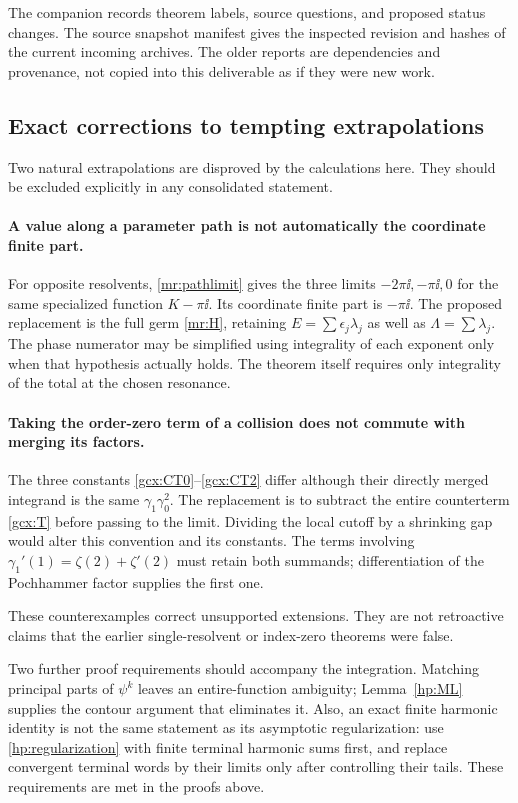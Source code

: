 The companion  records theorem labels,
source questions, and proposed status changes. The source snapshot
manifest gives the inspected revision and hashes of the current incoming
archives. The older reports are dependencies and provenance, not copied
into this deliverable as if they were new work.

\subsection{Exact corrections to tempting extrapolations}

Two natural extrapolations are disproved by the calculations here.
They should be excluded explicitly in any consolidated statement.

\paragraph{A value along a parameter path is not automatically the
coordinate finite part.}
For opposite resolvents, \eqref{mr:pathlimit} gives the three limits
$-2\pi\ii,-\pi\ii,0$ for the same specialized function $K-\pi\ii$.
Its coordinate finite part is $-\pi\ii$.
The proposed replacement is the full germ \eqref{mr:H}, retaining
$E=\sum\epsilon_j\lambda_j$ as well as $\Lambda=\sum\lambda_j$.
The phase numerator may be simplified using integrality of each exponent
only when that hypothesis actually holds. The theorem itself requires
only integrality of the total at the chosen resonance.

\paragraph{Taking the order-zero term of a collision does not commute
with merging its factors.}
The three constants \eqref{gcx:CT0}--\eqref{gcx:CT2} differ although
their directly merged integrand is the same
$\gamma_1\gamma_0^2$. The replacement is to subtract the entire
counterterm \eqref{gcx:T} before passing to the limit. Dividing the local
cutoff by a shrinking gap would alter this convention and its constants.
The terms involving
$\gamma_1'(1)=\zeta(2)+\zeta'(2)$ must retain both summands;
differentiation of the Pochhammer factor supplies the first one.

These counterexamples correct unsupported extensions. They are not
retroactive claims that the earlier single-resolvent or index-zero
theorems were false.

Two further proof requirements should accompany the integration.
Matching principal parts of $\psi^k$ leaves an entire-function
ambiguity; Lemma~\ref{hp:ML} supplies the contour argument that eliminates
it. Also, an exact finite harmonic identity is not the same statement as
its asymptotic regularization: use \eqref{hp:regularization} with finite
terminal harmonic sums first, and replace convergent terminal words by
their limits only after controlling their tails. These requirements are
met in the proofs above.

